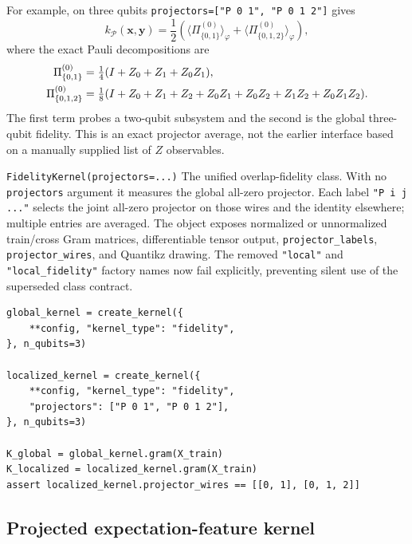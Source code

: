 \documentclass[10pt]{article}
\newcommand{\code}[1]{\texttt{#1}}
\begin{document}
For example, on three qubits
\code{projectors=["P 0 1", "P 0 1 2"]} gives
\begin{equation}
  k_{\mathcal P}(\bm{x},\bm{y})
  =\frac{1}{2}\left(
    \langle\Pi_{\{0,1\}}^{(0)}\rangle_{\varphi}
   +\langle\Pi_{\{0,1,2\}}^{(0)}\rangle_{\varphi}\right),
  \label{eq:mixed-projector-fidelity-example}
\end{equation}
where the exact Pauli decompositions are
\begin{align}
  \Pi_{\{0,1\}}^{(0)}
  &=\tfrac14(I+Z_0+Z_1+Z_0Z_1), \notag\\
  \Pi_{\{0,1,2\}}^{(0)}
  &=\tfrac18(I+Z_0+Z_1+Z_2+Z_0Z_1+Z_0Z_2+Z_1Z_2+Z_0Z_1Z_2).
  \label{eq:mixed-projector-pauli-expansion}
\end{align}
The first term probes a two-qubit subsystem and the second is the global
three-qubit fidelity.  This is an exact projector average, not the earlier
interface based on a manually supplied list of $Z$ observables.

\begin{qaspfeature}{\code{FidelityKernel(projectors=...)}}
The unified overlap-fidelity class.  With no \code{projectors} argument it
measures the global all-zero projector.  Each label \code{"P i j ..."}
selects the joint all-zero projector on those wires and the identity
elsewhere; multiple entries are averaged.  The object exposes normalized or
unnormalized train/cross Gram matrices, differentiable tensor output,
\code{projector\_labels}, \code{projector\_wires}, and Quantikz drawing.
The removed \code{"local"} and \code{"local\_fidelity"} factory names now
fail explicitly, preventing silent use of the superseded class contract.
\end{qaspfeature}

\begin{lstlisting}[caption={The same \code{FidelityKernel} class in global and mixed-locality projector configurations.},label={lst:projector-fidelity}]
global_kernel = create_kernel({
    **config, "kernel_type": "fidelity",
}, n_qubits=3)

localized_kernel = create_kernel({
    **config, "kernel_type": "fidelity",
    "projectors": ["P 0 1", "P 0 1 2"],
}, n_qubits=3)

K_global = global_kernel.gram(X_train)
K_localized = localized_kernel.gram(X_train)
assert localized_kernel.projector_wires == [[0, 1], [0, 1, 2]]
\end{lstlisting}

\subsection{Projected expectation-feature kernel}
\label{sec:projected-kernel}
\end{document}
